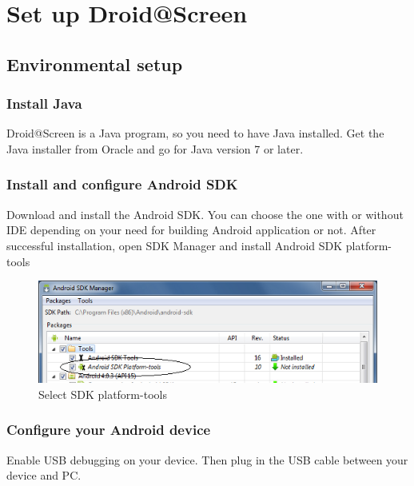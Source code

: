 \chapter{Set up Droid@Screen}
\label{ch:droid_setup}
\section{Environmental setup \cite{droid_setup}}
\subsection{Install Java}
Droid@Screen is a Java program, so you need to have Java installed. Get the Java installer from Oracle and go for Java version 7 or later.

\subsection{Install and configure Android SDK}
Download and install the Android SDK. You can choose the one with or without IDE depending on your need for building Android application or not.
\newline
After successful installation, open SDK Manager and install Android SDK platform-tools
    
    \begin{figure}[H]
		\centering
		\includegraphics[scale=0.65]{Chapters/Fig/sdk_mng.png}
		\caption{Select SDK platform-tools}
		\label{fig:sdk_mng}
	\end{figure}

\subsection{Configure your Android device}
Enable USB debugging on your device. Then plug in the USB cable between your device and PC.
    
